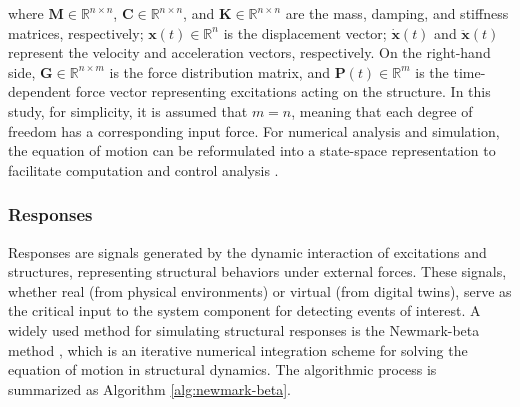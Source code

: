 \documentclass[a4paper,fleqn,numbers,sort&compress]{cas-sc}
\begin{document}
where $\mathbf{M} \in \mathbb{R}^{n \times n}$, $\mathbf{C} \in \mathbb{R}^{n \times n}$, and $\mathbf{K} \in \mathbb{R}^{n \times n}$ are the mass, damping, and stiffness matrices, respectively; $\mathbf{x}(t) \in \mathbb{R}^{n}$ is the displacement vector; $\dot{\mathbf{x}}(t)$ and $\ddot{\mathbf{x}}(t)$ represent the velocity and acceleration vectors, respectively. On the right-hand side, $\mathbf{G} \in \mathbb{R}^{n \times m}$ is the force distribution matrix, and $\mathbf{P}(t) \in \mathbb{R}^{m}$ is the time-dependent force vector representing excitations acting on the structure. In this study, for simplicity, it is assumed that $m = n$, meaning that each degree of freedom has a corresponding input force. For numerical analysis and simulation, the equation of motion can be reformulated into a state-space representation to facilitate computation and control analysis \citep{newmark_methodcomputationstructural_1959}. 

\subsubsection{Responses}
\label{environment-responses}

Responses are signals generated by the dynamic interaction of excitations and structures, representing structural behaviors under external forces. These signals, whether real (from physical environments) or virtual (from digital twins), serve as the critical input to the system component for detecting events of interest. A widely used method for simulating structural responses is the Newmark-beta method \citep{newmark_methodcomputationstructural_1959}, which is an iterative numerical integration scheme for solving the equation of motion in structural dynamics. The algorithmic process is summarized as Algorithm \ref{alg:newmark-beta}.
\end{document}
